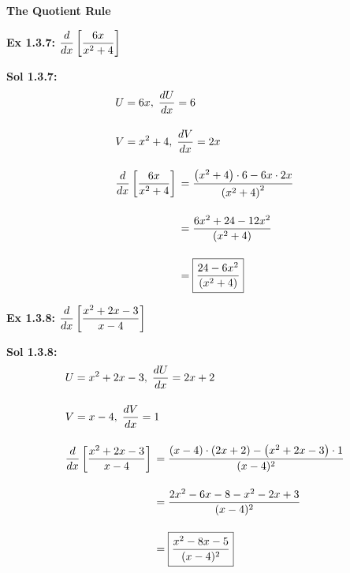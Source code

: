 \bigskip

\textbf{\large{The Quotient Rule}}

\begin{tcolorbox}[example]
    \textbf{Ex 1.3.7: } $\dfrac{d}{dx} \left[\dfrac{6x}{x^2 + 4}\right]$
\end{tcolorbox}
\begin{tcolorbox}[solution]
    \textbf{Sol 1.3.7: } \begin{align*}
        & U = 6x, \; \dfrac{dU}{dx} = 6 \\[11pt]
        & V = x^2 + 4, \; \dfrac{dV}{dx} = 2x \\[11pt]
        & \dfrac{d}{dx} \left[\dfrac{6x}{x^2 + 4}\right] \begin{aligned}[t]
            & = \dfrac{\left(x^2 + 4\right) \cdot 6 - 6x \cdot 2x}{\left(x^2 + 4\right)^2} \\[11pt]
            & = \dfrac{6x^2 + 24 - 12x^2}{\left(x^2 + 4\right)} \\[11pt]
            & = \boxed{\dfrac{24 - 6x^2}{\left(x^2 + 4\right)}}
        \end{aligned}
    \end{align*}
\end{tcolorbox} \vspace{11pt}    

\begin{tcolorbox}[example]
    \textbf{Ex 1.3.8: } $\dfrac{d}{dx} \left[\dfrac{x^2 + 2x - 3}{x - 4}\right]$ 
\end{tcolorbox}
\begin{tcolorbox}[solution]
    \textbf{Sol 1.3.8: } \begin{align*}
        & U = x^2 + 2x - 3, \; \dfrac{dU}{dx} = 2x + 2 \\[11pt]
        & V = x - 4, \; \dfrac{dV}{dx} = 1 \\[11pt]
        & \dfrac{d}{dx} \left[\dfrac{x^2 + 2x - 3}{x - 4}\right] \begin{aligned}[t]
            & = \dfrac{(x - 4) \cdot (2x + 2) - \left(x^2 + 2x - 3\right) \cdot 1}{(x - 4)^2} \\[11pt]
            & = \dfrac{2x^2 - 6x - 8 - x^2 - 2x + 3}{(x - 4)^2} \\[11pt]
            & = \boxed{\dfrac{x^2 - 8x - 5}{(x - 4)^2}}
        \end{aligned}
    \end{align*} 
\end{tcolorbox} \vspace{11pt}

